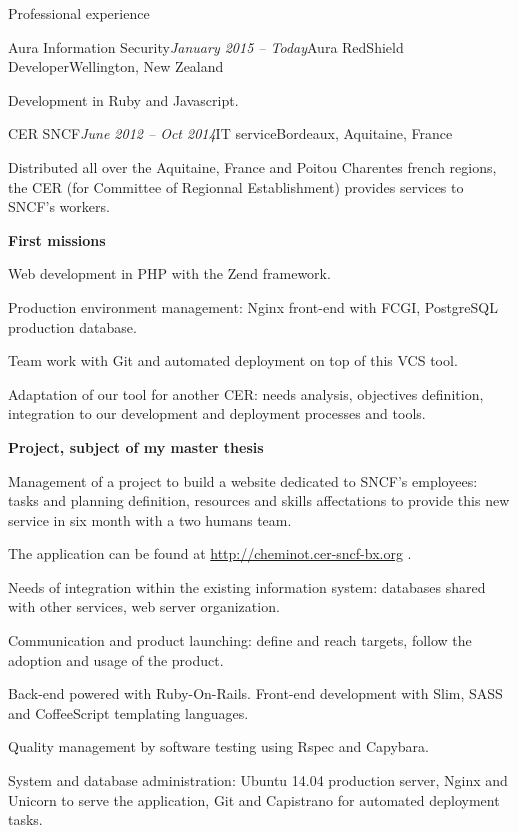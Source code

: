 \begin{rSection}{Professional experience}

  \begin{rSubsection}{Aura Information Security}{\em January 2015 -- Today}{Aura RedShield Developer}{Wellington, New Zealand}
    \item[] Development in Ruby and Javascript.
  \end{rSubsection}



  \begin{rSubsection}{CER SNCF}{\em June 2012 -- Oct 2014}{IT service}{Bordeaux, Aquitaine, France}
    \item[] Distributed all over the Aquitaine, France and Poitou Charentes french regions, the CER (for Committee of Regionnal Establishment) provides services to SNCF's workers.

    \textbf{First missions}
      \item Web development in PHP with the Zend framework.
      \item Production environment management: Nginx front-end with FCGI, PostgreSQL production database.
      \item Team work with Git and automated deployment on top of this VCS tool.
      \item Adaptation of our tool for another CER: needs analysis, objectives definition, integration to our development and deployment processes and tools.

    \textbf{Project, subject of my master thesis}
      \item Management of a project to build a website dedicated to SNCF's employees: tasks and planning definition, resources and skills affectations to provide this new service in six month with a two humans team.
      \item The application can be found at \href{http://cheminot.cer-sncf-bx.org}{http://cheminot.cer-sncf-bx.org} .
      \item Needs of integration within the existing information system: databases shared with other services, web server organization.
      \item Communication and product launching: define and reach targets, follow the adoption and usage of the product.
      \item Back-end powered with Ruby-On-Rails. Front-end development with Slim, SASS and CoffeeScript templating languages.
      \item Quality management by software testing using Rspec and Capybara.
      \item System and database administration: Ubuntu 14.04 production server, Nginx and Unicorn to serve the application, Git and Capistrano for automated deployment tasks.


\end{rSubsection}
\end{rSection}
